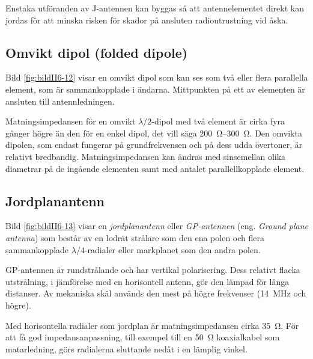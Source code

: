 Enstaka utföranden av J-antennen kan byggas så att antennelementet direkt kan
jordas för att minska risken för skador på ansluten radioutrustning vid åska.


\subsection{Omvikt dipol (folded dipole)}

Bild \ref{fig:bildII6-12} visar en omvikt dipol som kan ses som två eller flera
parallella element, som är sammankopplade i ändarna.
Mittpunkten på ett av elementen är ansluten till antennledningen.

Matningsimpedansen för en omvikt \(\lambda/2\)-dipol med två element är
cirka fyra gånger högre än den för en enkel dipol, det vill säga
\SIrange{200}{300}{\ohm}.
Den omvikta dipolen, som endast fungerar på grundfrekvensen och på
dess udda övertoner, är relativt bredbandig.
Matningsimpedansen kan ändras med sinsemellan olika diametrar på de ingående
elementen samt med antalet parallellkopplade element.


\subsection{Jordplanantenn}
\label{jordplanantenn}

Bild \ref{fig:bildII6-13} visar en \emph{jordplanantenn} eller
\emph{GP-antennen} (eng. \emph{Ground plane antenna}) som består av en
lodrät strålare som den ena polen och flera sammankopplade
\(\lambda/4\)-radialer eller markplanet som den andra polen.

GP-antennen är rundstrålande och har vertikal polarisering.
Dess relativt flacka utstrålning, i jämförelse med en horisontell antenn,
gör den lämpad för långa distanser.
Av mekaniska skäl används den mest på högre frekvenser (\SI{14}{\mega\hertz}
och högre).

Med horisontella radialer som jordplan är matningsimpedansen cirka
\SI{35}{\ohm}.
För att få god impedansanpassning, till exempel till en \SI{50}{\ohm}
koaxialkabel som matarledning, görs radialerna sluttande nedåt i en lämplig
vinkel.

